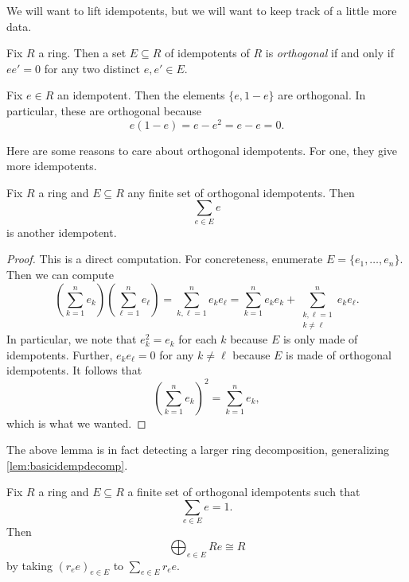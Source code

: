 We will want to lift idempotents, but we will want to keep track of a little more data.
\begin{definition}
	Fix $R$ a ring. Then a set $E\subseteq R$ of idempotents of $R$ is \textit{orthogonal} if and only if $ee'=0$ for any two distinct $e,e'\in E$.
\end{definition}
\begin{example}
	Fix $e\in R$ an idempotent. Then the elements $\{e,1-e\}$ are orthogonal. In particular, these are orthogonal because
	\[e(1-e)=e-e^2=e-e=0.\]
\end{example}
Here are some reasons to care about orthogonal idempotents. For one, they give more idempotents.
\begin{lemma} \label{lem:sumidemps}
	Fix $R$ a ring and $E\subseteq R$ any finite set of orthogonal idempotents. Then
	\[\sum_{e\in E}e\]
	is another idempotent.
\end{lemma}
\begin{proof}
	This is a direct computation. For concreteness, enumerate $E=\{e_1,\ldots,e_n\}$. Then we can compute
	\[\left(\sum_{k=1}^ne_k\right)\left(\sum_{\ell=1}^ne_\ell\right)=\sum_{k,\ell=1}^ne_ke_\ell=\sum_{k=1}^ne_ke_k+\sum_{\substack{k,\ell=1\\k\ne\ell}}^ne_ke_\ell.\]
	In particular, we note that $e_k^2=e_k$ for each $k$ because $E$ is only made of idempotents. Further, $e_ke_\ell=0$ for any $k\ne\ell$ because $E$ is made of orthogonal idempotents. It follows that
	\[\left(\sum_{k=1}^ne_k\right)^2=\sum_{k=1}^ne_k,\]
	which is what we wanted.
\end{proof}
The above lemma is in fact detecting a larger ring decomposition, generalizing \autoref{lem:basicidempdecomp}.
\begin{lemma} \label{lem:idempringdecomp}
	Fix $R$ a ring and $E\subseteq R$ a finite set of orthogonal idempotents such that
	\[\sum_{e\in E}e=1.\]
	Then
	\[\bigoplus_{e\in E}Re\cong R\]
	by taking $(r_ee)_{e\in E}$ to $\sum_{e\in E}r_ee$.
\end{lemma}
